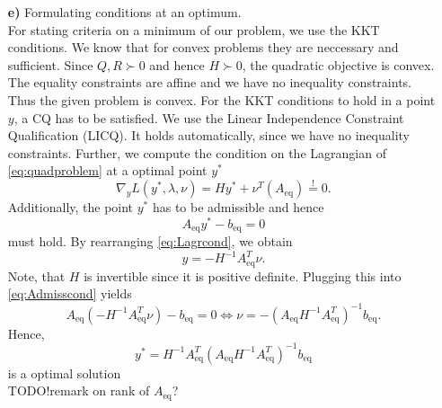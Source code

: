 \documentclass[]{article}
\newcommand{\yopt}{y^*}
\newcommand{\todo}{{\color{red} TODO!}}
\newcommand{\ind}[2]{{#1}_{\mathrm{#2}}}
\newcommand{\trp}{^T}
\newcommand{\Aeq}{\ind{A}{eq}}
\newcommand{\beq}{\ind{b}{eq}}
\newcommand{\grad}{\nabla}
\newcommand{\inv}{^{-1}}
\begin{document}
\begin{enumerate}
\item[\bf e)] Formulating  conditions at an optimum.\\
For stating criteria on a minimum of our problem, we use the KKT conditions.
We know that for convex problems they are neccessary and sufficient. Since $ Q,R \succ 0$ and hence $ H \succ 0 $, the quadratic objective is convex. The equality constraints are affine and we have no inequality constraints. Thus the given problem is convex. For the KKT conditions to hold in a point $ y$, a CQ has to be satisfied. We use the Linear Independence Constraint Qualification (LICQ).
It holds automatically, since we have no inequality constraints. 
Further, we compute the condition on the Lagrangian of \eqref{eq:quadproblem} at a optimal point $ \yopt $
\begin{equation}
	\grad_y	L(\yopt,\lambda,\nu) = H\yopt + \nu \trp (\Aeq) \overset{!}{=} 0. \label{eq:Lagrcond}
\end{equation}
Additionally, the point $ \yopt $ has to be admissible and hence \begin{equation}
	\Aeq \yopt - \beq = 0 \label{eq:Admisscond}
\end{equation}
must hold.
By rearranging \eqref{eq:Lagrcond}, we obtain
\[ y = - H\inv\Aeq \trp \nu. \] Note, that $ H $ is invertible since it is positive definite.
Plugging this into \eqref{eq:Admisscond} yields
\[  \Aeq (-H\inv \Aeq \trp \nu) -\beq = 0 \Longleftrightarrow \nu = -(\Aeq H\inv \Aeq\trp)\inv \beq.\]
Hence, \[ \yopt = H\inv \Aeq\trp (\Aeq H\inv \Aeq\trp)\inv \beq \] is a optimal solution\\
\todo remark on rank of $ \Aeq $?

\end{enumerate}
\end{document}
